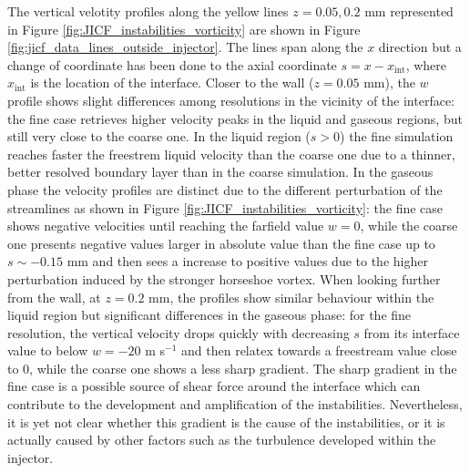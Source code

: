 The vertical velotity profiles along the yellow lines $z = 0.05, 0.2$ mm represented in Figure \ref{fig:JICF_instabilities_vorticity} are shown in Figure \ref{fig:jicf_data_lines_outside_injector}. The lines span along the $x$ direction but a change of coordinate has been done to the axial coordinate $s = x - x_\mathrm{int}$, where $x_\mathrm{int}$ is the location of the interface. Closer to the wall ($z = 0.05$ mm), the $w$ profile shows slight differences among resolutions in the vicinity of the interface: the fine case retrieves higher velocity peaks in the liquid and gaseous regions, but still very close to the coarse one. In the liquid region ($s > 0$) the fine simulation reaches faster the freestrem liquid velocity than the coarse one due to a thinner, better resolved boundary layer than in the coarse simulation. In the gaseous phase the velocity profiles are distinct due to the different perturbation of the streamlines as shown in Figure \ref{fig:JICF_instabilities_vorticity}: the fine case shows negative velocities until reaching the farfield value $w = 0$, while the coarse one presents negative values larger in absolute value than the fine case up to $s \sim -0.15$ mm and then sees a increase to positive values due to the higher perturbation induced by the stronger horseshoe vortex. When looking further from the wall, at $z = 0.2$ mm, the profiles show similar behaviour within the liquid region but significant differences in the gaseous phase: for the fine resolution, the vertical velocity drops quickly with decreasing $s$ from its interface value to below $w = - 20$ m s$^{-1}$ and then relatex towards a freestream value close to 0, while the coarse one shows a less sharp gradient. The sharp gradient in the fine case is a possible source of shear force around the interface which can contribute to the development and amplification of the instabilities. Nevertheless, it is yet not clear whether this gradient is the cause of the instabilities, or it is actually caused by other factors such as the turbulence developed within the injector.


